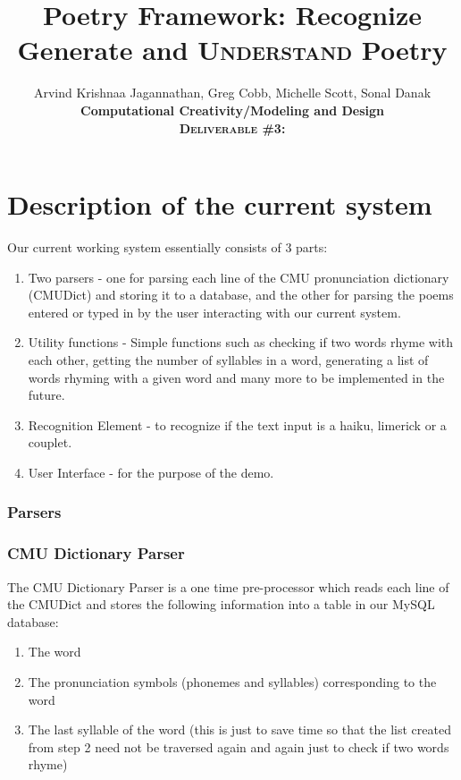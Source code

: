 \documentclass[10pt, letter]{article}
\newcommand{\doctitle}{%
Computational Creativity/Modeling and Design}
\begin{document}
\title{Poetry Framework: Recognize Generate and \textsc{Understand} Poetry}
	\author{Arvind Krishnaa Jagannathan, Greg Cobb,
	Michelle Scott, Sonal Danak 
	\\[0.5cm] \textbf{\doctitle} \\
	\textsc{\textbf{Deliverable \#3:}} \date{}
	}
\maketitle
\thispagestyle{empty}
\section*{Description of the current system}
Our current working system essentially consists of 3 parts:
\begin{enumerate}
\item Two parsers - one for parsing each line of the CMU pronunciation dictionary (CMUDict) \cite{cmudict} and storing it to a database, and the other for parsing the poems entered or typed in by the user interacting with our current system.
\item Utility functions - Simple functions such as checking if two words rhyme with each other, getting the number of syllables in a word, generating a list of words rhyming with a given word and many more to be implemented in the future.
\item Recognition Element - to recognize if the text input is a haiku, limerick or a couplet.
\item User Interface - for the purpose of the demo.
\end{enumerate}
\subsubsection*{Parsers}
\subsubsection*{CMU Dictionary Parser}
The CMU Dictionary Parser is a one time pre-processor which reads each line of the CMUDict and stores the following information into a table in our MySQL database:
\begin{enumerate}
\item The word

\item The pronunciation symbols (phonemes and syllables) corresponding to the word

\item The last syllable of the word (this is just to save time so that the list created from step 2 need not be traversed again and again just to check if two words rhyme)
\end{enumerate}
\end{document}
